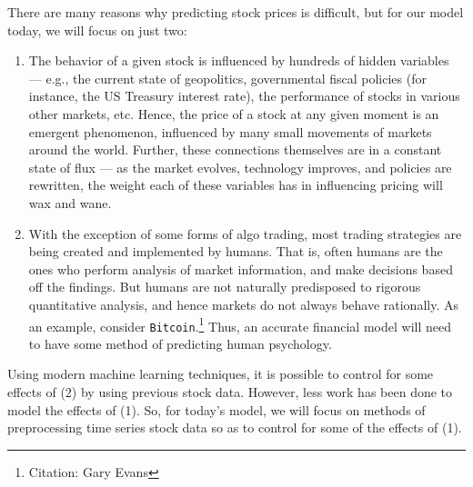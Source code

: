 \documentclass[final]{article}
\begin{document}
There are many reasons why predicting stock prices is difficult, but
for our model today, we will focus on just two:
\begin{enumerate}
  \item The behavior of a given stock is influenced by hundreds of
    hidden variables --- e.g., the current state of geopolitics,
    governmental fiscal policies (for instance, the US Treasury
    interest rate), the performance of stocks in various other
    markets, etc. Hence, the price of a stock at any given moment is
    an emergent phenomenon, influenced by many small movements of
    markets around the world. Further, these connections themselves
    are in a constant state of flux --- as the market evolves,
    technology improves, and policies are rewritten, the weight each
    of these variables has in influencing pricing will wax and wane.
  \item With the exception of some forms of algo trading, most trading
    strategies are being created and implemented by humans. That is,
    often humans are the ones who perform analysis of market
    information, and make decisions based off the findings. But humans
    are not naturally predisposed to rigorous quantitative analysis,
    and hence markets do not always behave rationally. As an example,
    consider \texttt{Bitcoin}.\footnote{Citation: Gary Evans} Thus,
    an accurate financial model will need to have some method of
    predicting human psychology.
\end{enumerate}

Using modern machine learning techniques, it is possible to control
for some effects of (2) by using previous stock data. However,
less work has been done to model the effects of (1). So, for today's
model, we will focus on methods of preprocessing time series stock
data so as to control for some of the effects of (1).

\end{document}
